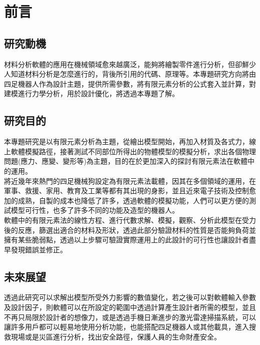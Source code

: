 \chapter{前言}
\renewcommand{\baselinestretch}{10.0} %
\setcounter{page}{1}  %
\fontsize{14pt}{2.5pt}\sectionef
\section{研究動機}
材料分析軟體的應用在機械領域愈來越廣泛，能夠將繪製零件進行分析，但卻鮮少人知道材料分析是怎麼進行的，背後所引用的代碼、原理等。本專題研究方向將由四足機器人作為設計主題，提供所需參數，將有限元素分析的公式套入並計算，對建模進行力學分析，用於設計優化，將透過本專題了解。

\section{研究目的}
本專題研究是以有限元素分析為主題，從繪出模型開始，再加入材質及各式力，線上軟體模擬路徑，接著測試不同部位所得出的物體模型的模擬分析，求出各個物理問題(應力、應變、變形等)為主題，目的在於更加深入的探討有限元素法在軟體中的運用。\\

將近幾年來熱門的四足機械狗設定為有限元素法載體，因其在多個領域的運用，在軍事、救援、家用、教育及工業等都有其出現的身影，並且近來電子技術及控制愈加的成熟，自製的成本也降低了許多，透過軟體的模擬功能，人們可以更方便的測試模型可行性，也多了許多不同的功能及造型的機器人。\\

軟體中的有限元素法的線性方程、進行代數求解、模擬，觀察、分析此模型在受力後的反應，篩選出適合的材料及形狀，透過此部分驗證材料的性質是否能夠負荷並擁有某些脆弱點，透過以上步驟可驗證實際運用上的此設計的可行性也讓設計者盡早發現錯誤並修正。\\

\section{未來展望}
透過此研究可以求解出模型所受外力影響的數值變化，若之後可以對軟體輸入參數及設計因子，則軟體可以在所設定的範圍中透過計算產生設計者所需的模型，並且不再只局限於設計者的想像力，或是透過手機日漸進步的激光雷達掃描系統，可以讓許多用戶都可以輕易地使用分析功能，也能搭配四足機器人或其他載具，進入搜救現場或是災區進行分析，找出安全路徑，保護人員的生命財產安全。\\

